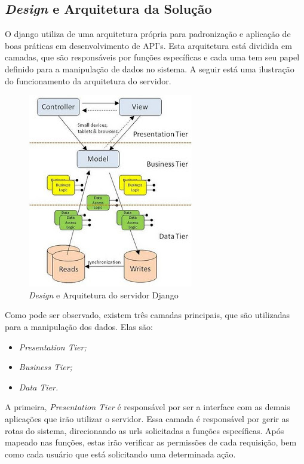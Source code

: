 \subsection{\textit{Design} e Arquitetura da Solução}
\label{sub:design_e_arquitetura_da_soluca_o}

O django utiliza de uma arquitetura própria para padronização e aplicação de boas
práticas em desenvolvimento de API's. Esta arquitetura está dividida em camadas,
que são responsáveis por funções específicas e cada uma tem seu papel definido
para a manipulação de dados no sistema. A seguir está uma ilustração do funcionamento
da arquitetura do servidor. 

\begin{figure}
    \begin{center}
        \includegraphics[scale=1]{figuras/rest_arch.jpg}
    \end{center}
    \caption{\textit{Design} e Arquitetura do servidor Django \cite{serveruml}}
    \label{fig:rest_arch}
\end{figure}

Como pode ser observado, existem três camadas principais, que são utilizadas
para a manipulação dos dados. Elas são:

\begin{itemize}
    \item \textit{Presentation Tier;}
    \item \textit{Business Tier;}
    \item \textit{Data Tier.}
\end{itemize}

A primeira, \textit{Presentation Tier} é responsável por ser a interface com as demais aplicações
que irão utilizar o servidor. Essa camada é responsável por gerir as rotas do sistema, direcionando
as urls solicitadas a funções específicas. Após mapeado nas funções, estas irão verificar as permissões
de cada requisição, bem como cada usuário que está solicitando uma determinada ação.

